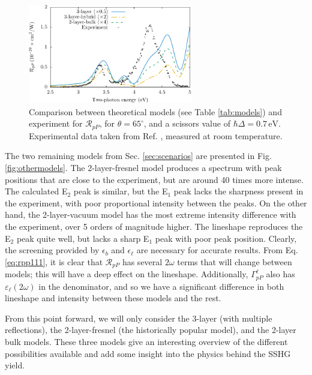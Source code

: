 \begin{figure}[b]
\centering 
\includegraphics[width=0.64\textwidth]{content/figures/fig-Si1x1-Mejia_RpP}
\caption[$\mathcal{R}_{pP}$ compared to experimental data from Mejia et al.]
{Comparison between theoretical models (see Table \ref{tab:models}) and
experiment for $\mathcal{R}_{pP}$, for $\theta=65^{\circ}$, and a scissors value
of $\hbar\Delta = 0.7\,\text{eV}$. Experimental data taken from Ref. 
\cite{mejiaPRB02}, measured at room temperature.}
\label{fig:RpP}
\end{figure}

The two remaining models from Sec. \ref{sec:scenarios} are presented in Fig.
\ref{fig:othermodels}. The 2-layer-fresnel model produces a spectrum with peak
positions that are close to the experiment, but are around 40 times more
intense. The calculated E$_{2}$ peak is similar, but the E$_{1}$ peak lacks the
sharpness present in the experiment, with poor proportional intensity between
the peaks. On the other hand, the 2-layer-vacuum model has the most extreme
intensity difference with the experiment, over 5 orders of magnitude higher. The
lineshape reproduces the E$_{2}$ peak quite well, but lacks a sharp E$_{1}$ peak
with poor peak position. Clearly, the screening provided by $\epsilon_{b}$ and
$\epsilon_{\ell}$ are necessary for accurate results. From Eq.
\eqref{eq:rpp111}, it is clear that $\mathcal{R}_{pP}$ has several $2\omega$
terms that will change between models; this will have a deep effect on the
lineshape. Additionally, $\Gamma^{\ell}_{pP}$ also has
$\varepsilon_{\ell}(2\omega)$ in the denominator, and so we have a significant
difference in both lineshape and intensity between these models and the rest.

From this point forward, we will only consider the 3-layer (with multiple
reflections), the 2-layer-fresnel (the historically popular model), and the
2-layer bulk models. These three models give an interesting overview of the
different possibilities available and add some insight into the physics behind
the SSHG yield.

